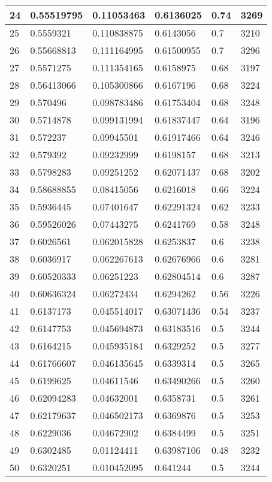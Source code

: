 \begin{longtable}{|l|l|l|l|l|l|}
24 & 0.55519795 & 0.11053463 & 0.6136025 & 0.74 & 3269 \\ \hline 
25 & 0.5559321 & 0.110838875 & 0.6143056 & 0.7 & 3210 \\ \hline 
26 & 0.55668813 & 0.111164995 & 0.61500955 & 0.7 & 3296 \\ \hline 
27 & 0.5571275 & 0.111354165 & 0.6158975 & 0.68 & 3197 \\ \hline 
28 & 0.56413066 & 0.105300866 & 0.6167196 & 0.68 & 3224 \\ \hline 
29 & 0.570496 & 0.098783486 & 0.61753404 & 0.68 & 3248 \\ \hline 
30 & 0.5714878 & 0.099131994 & 0.61837447 & 0.64 & 3196 \\ \hline 
31 & 0.572237 & 0.09945501 & 0.61917466 & 0.64 & 3246 \\ \hline 
32 & 0.579392 & 0.09232999 & 0.6198157 & 0.68 & 3213 \\ \hline 
33 & 0.5798283 & 0.09251252 & 0.62071437 & 0.68 & 3202 \\ \hline 
34 & 0.58688855 & 0.08415056 & 0.6216018 & 0.66 & 3224 \\ \hline 
35 & 0.5936445 & 0.07401647 & 0.62291324 & 0.62 & 3233 \\ \hline 
36 & 0.59526026 & 0.07443275 & 0.6241769 & 0.58 & 3248 \\ \hline 
37 & 0.6026561 & 0.062015828 & 0.6253837 & 0.6 & 3238 \\ \hline 
38 & 0.6036917 & 0.062267613 & 0.62676966 & 0.6 & 3281 \\ \hline 
39 & 0.60520333 & 0.06251223 & 0.62804514 & 0.6 & 3287 \\ \hline 
40 & 0.60636324 & 0.06272434 & 0.6294262 & 0.56 & 3226 \\ \hline 
41 & 0.6137173 & 0.045514017 & 0.63071436 & 0.54 & 3237 \\ \hline 
42 & 0.6147753 & 0.045694873 & 0.63183516 & 0.5 & 3244 \\ \hline 
43 & 0.6164215 & 0.045935184 & 0.6329252 & 0.5 & 3277 \\ \hline 
44 & 0.61766607 & 0.046135645 & 0.6339314 & 0.5 & 3265 \\ \hline 
45 & 0.6199625 & 0.04611546 & 0.63490266 & 0.5 & 3260 \\ \hline 
46 & 0.62094283 & 0.04632001 & 0.6358731 & 0.5 & 3261 \\ \hline 
47 & 0.62179637 & 0.046502173 & 0.6369876 & 0.5 & 3253 \\ \hline 
48 & 0.6229036 & 0.04672902 & 0.6384499 & 0.5 & 3251 \\ \hline 
49 & 0.6302485 & 0.01124411 & 0.63987106 & 0.48 & 3232 \\ \hline 
50 & 0.6320251 & 0.010452095 & 0.641244 & 0.5 & 3244 \\ \hline 
\end{longtable}